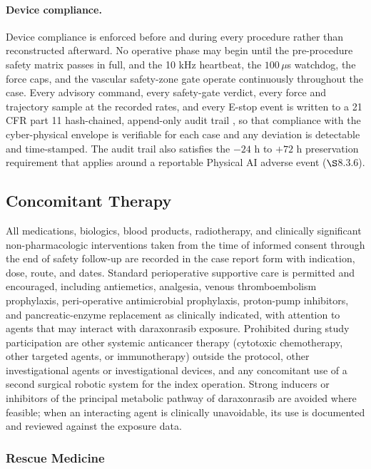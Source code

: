 \paragraph{Device compliance.}
Device compliance is enforced before and during every procedure rather than
reconstructed afterward. No operative phase may begin until the pre-procedure
safety matrix passes in full, and the 10 kHz heartbeat, the $100\,\mu$s watchdog,
the force caps, and the vascular safety-zone gate operate continuously throughout
the case. Every advisory command, every safety-gate verdict, every force and
trajectory sample at the recorded rates, and every E-stop event is written to a
21 CFR part 11 hash-chained, append-only audit trail \cite{ecfr2026part11}, so that
compliance with the cyber-physical envelope is verifiable for each case and any
deviation is detectable and time-stamped. The audit trail also satisfies the
$-24$ h to $+72$ h preservation requirement that applies around a reportable
Physical AI adverse event ($\S$8.3.6).

\subsection{Concomitant Therapy}

All medications, biologics, blood products, radiotherapy, and clinically significant
non-pharmacologic interventions taken from the time of informed consent through the
end of safety follow-up are recorded in the case report form with indication, dose,
route, and dates. Standard perioperative supportive care is permitted and
encouraged, including antiemetics, analgesia, venous thromboembolism prophylaxis,
peri-operative antimicrobial prophylaxis, proton-pump inhibitors, and
pancreatic-enzyme replacement as clinically indicated, with attention to agents that
may interact with daraxonrasib exposure. Prohibited during study participation are
other systemic anticancer therapy (cytotoxic chemotherapy, other targeted agents,
or immunotherapy) outside the protocol, other investigational agents or
investigational devices, and any concomitant use of a second surgical robotic
system for the index operation. Strong inducers or inhibitors of the principal
metabolic pathway of daraxonrasib are avoided where feasible; when an interacting
agent is clinically unavoidable, its use is documented and reviewed against the
exposure data.

\subsubsection{Rescue Medicine}

